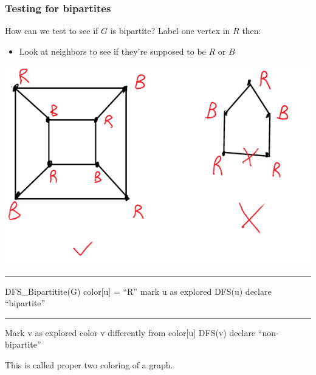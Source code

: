 \documentclass[11pt]{article}
\begin{document}
\subsubsection{Testing for bipartites}
\label{sec:org66ddccf}
How can we test to see if \(G\) is bipartite? Label one vertex in \(R\) then:
\begin{itemize}
\item Look at neighbors to see if they're supposed to be \(R\) or \(B\)
\end{itemize}
\begin{center}
\includegraphics[width=.9\linewidth]{./Images/i20.png}
\end{center}

\noindent\rule{\textwidth}{0.5pt}
\begin{algorithmic}
  \State DFS\_Bipartitite(G)
                \State color[u] = ``R''
                \State mark u as explored
                \State DFS(u)
        \EndIf
 \EndFor
        \State declare ``bipartite''
\EndIf
      \end{algorithmic}

\noindent\rule{\textwidth}{0.5pt}
\begin{algorithmic}
  \State Mark v as explored
  \State color v differently from color[u]
  \State DFS(v)
  \State declare ``non-bipartite''
  \EndIf
  \EndFor
\end{algorithmic}
This is called proper two coloring of a graph.
\end{document}
